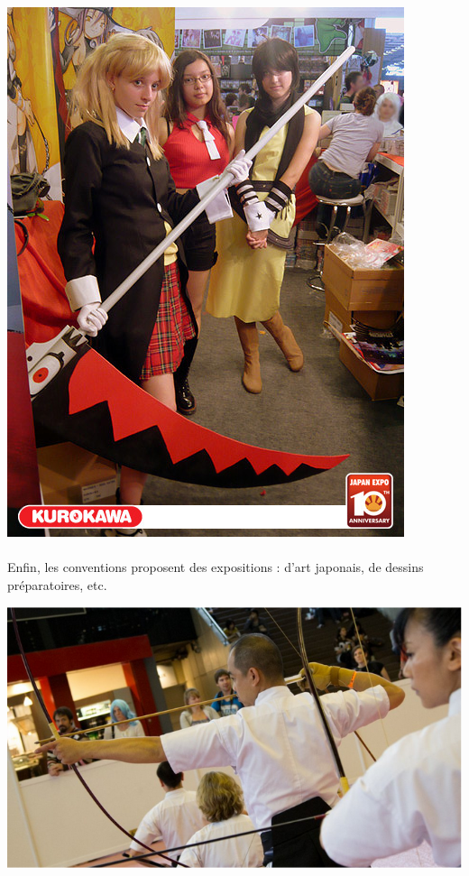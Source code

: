\begin{center}
	\includegraphics[scale=0.3]{cosplay.jpg}
\end{center}

\paragraph{} Enfin, les conventions proposent des expositions : d'art japonais,
de dessins préparatoires, etc.

\begin{center}
	\includegraphics[scale=0.4]{demo.png}
\end{center}

